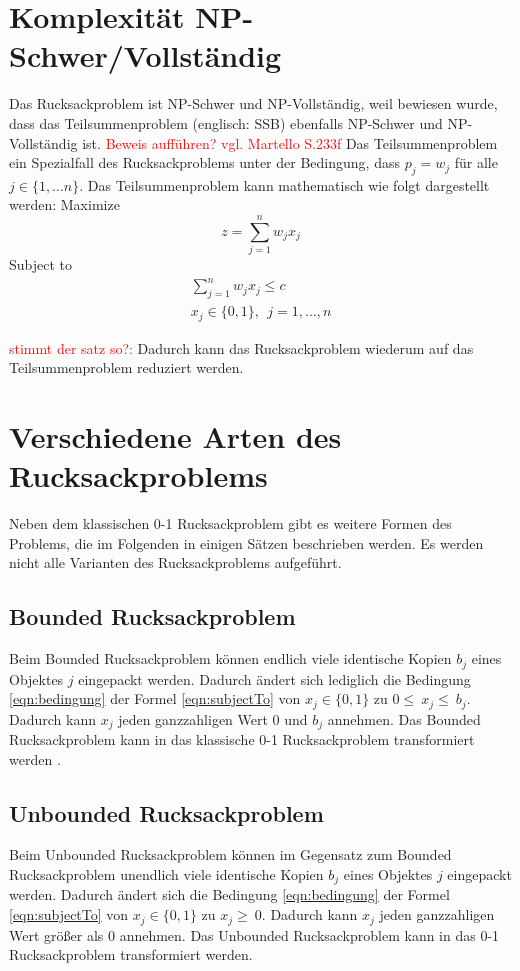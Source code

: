 \section{Komplexität NP-Schwer/Vollständig}
Das Rucksackproblem ist NP-Schwer und NP-Vollständig, weil bewiesen wurde, dass das Teilsummenproblem (englisch: \ac{SSB}) ebenfalls NP-Schwer und NP-Vollständig ist. \textcolor{red}{Beweis aufführen? vgl. Martello S.233f} Das Teilsummenproblem ein Spezialfall des Rucksackproblems unter der Bedingung, dass $p_j=w_j$ für alle $j \in \{1, \dots n\}$. Das Teilsummenproblem kann mathematisch wie folgt dargestellt werden: \cite[vgl.][]{Martello1987}
\newpage
Maximize
\begin{equation}
z=\sum_{j=1}^{n}{w_jx_j} 
\end{equation}
Subject to 
\begin{eqnarray}
\sum_{j=1}^{n}{w_jx_j\le c}\\
x_j\in\{0,1\},\ \ j=1,\ldots,n
\end{eqnarray}


\textcolor{red}{stimmt der satz so?:} Dadurch kann das Rucksackproblem wiederum auf das Teilsummenproblem reduziert werden. 

\section{Verschiedene Arten des Rucksackproblems}
Neben dem klassischen 0-1 Rucksackproblem gibt es weitere Formen des Problems, die im Folgenden in einigen Sätzen beschrieben werden. Es werden nicht alle Varianten des Rucksackproblems aufgeführt. 
\subsection{Bounded Rucksackproblem}
Beim Bounded Rucksackproblem können endlich viele identische Kopien $b_j$ eines Objektes $j$ eingepackt werden. Dadurch ändert sich lediglich die Bedingung \ref{eqn:bedingung} der Formel \ref{eqn:subjectTo} von $x_j\in\{0,1\}$ zu $0\le\ x_j\le\ b_j$. Dadurch kann $x_j$ jeden ganzzahligen Wert $0$ und $b_j$ annehmen. \cite[vgl.][]{Martello1990} Das Bounded Rucksackproblem kann in das klassische 0-1 Rucksackproblem transformiert werden \cite[vgl.][]{Schury2013}.
\subsection{Unbounded Rucksackproblem}
Beim Unbounded Rucksackproblem können im Gegensatz zum Bounded Rucksackproblem unendlich viele identische Kopien $b_j$ eines Objektes $j$ eingepackt werden. Dadurch ändert sich die Bedingung \ref{eqn:bedingung} der Formel \ref{eqn:subjectTo} von $x_j\in\{0,1\}$ zu $x_j\geq\ 0$. Dadurch kann $x_j$ jeden ganzzahligen Wert größer als $0$ annehmen. Das Unbounded Rucksackproblem kann in das 0-1 Rucksackproblem transformiert werden. \cite[vgl.][]{Schury2013}
